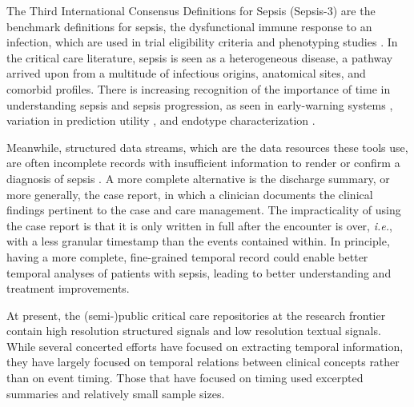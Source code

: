 \documentclass[pmlr,twocolumn,10pt]{jmlr} %
\begin{document}
The Third International Consensus Definitions for Sepsis (Sepsis-3) are the benchmark definitions for sepsis, the dysfunctional immune response to an infection, which are used in trial eligibility criteria \citep{kyriazopoulou2021procalcitonin} and phenotyping studies \citep{seymour2019derivation}.
In the critical care literature, sepsis is seen as a heterogeneous disease, a pathway arrived upon from a multitude of infectious origins, anatomical sites, and comorbid profiles.  
There is increasing recognition of the importance of time in understanding sepsis and sepsis progression, as seen in early-warning systems \citep{henry2022factors}, variation in prediction utility \citep{kamran2024evaluation}, and endotype characterization \citep{noroozizadeh2023temporal}.

Meanwhile, structured data streams, which are the data resources these tools use, are often incomplete records with insufficient information to render or confirm a diagnosis of sepsis \citep{moldwin2021empirical}. %
A more complete alternative is the discharge summary, or more generally, the case report, in which a clinician documents the clinical findings pertinent to the case and care management.
The impracticality of using the case report is that it is only written in full after the encounter is over, \emph{i.e.}, with a less granular timestamp than the events contained within. 
In principle, having a more complete, fine-grained temporal record could enable better temporal analyses of patients with sepsis, leading to better understanding and treatment improvements.

At present, the (semi-)public critical care repositories at the research frontier contain high resolution structured signals and low resolution textual signals. 
While several concerted efforts have focused on extracting temporal information, they have largely focused on temporal relations between clinical concepts \citep{sun2013evaluating} rather than on event timing.  
Those that have focused on timing \citep{leeuwenberg2020towards,frattallone2024using} used excerpted summaries and relatively small sample sizes. 

\end{document}
